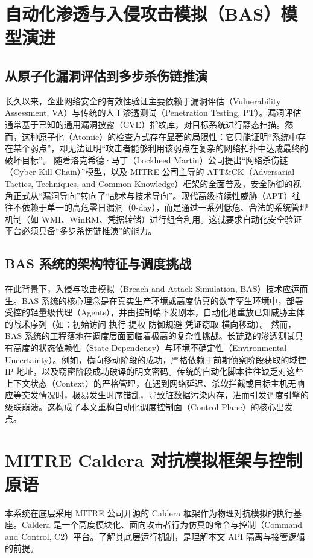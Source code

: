 \documentclass[twoside,openright]{xduugthesis}
\begin{document}
\section{自动化渗透与入侵攻击模拟（BAS）模型演进}

\subsection{从原子化漏洞评估到多步杀伤链推演}

长久以来，企业网络安全的有效性验证主要依赖于漏洞评估（Vulnerability Assessment, VA）与传统的人工渗透测试（Penetration Testing, PT）。漏洞评估通常基于已知的通用漏洞披露（CVE）指纹库，对目标系统进行静态扫描。然而，这种原子化（Atomic）的检查方式存在显著的局限性：它只能证明“系统中存在某个弱点”，却无法证明“攻击者能够利用该弱点在复杂的网络拓扑中达成最终的破坏目标”。
随着洛克希德·马丁（Lockheed Martin）公司提出“网络杀伤链（Cyber Kill Chain）”模型，以及 MITRE 公司主导的 ATT\&CK（Adversarial Tactics, Techniques, and Common Knowledge）框架的全面普及，安全防御的视角正式从“漏洞导向”转向了“战术与技术导向”\cite{strom2018mitre}。现代高级持续性威胁（APT）往往不依赖于单一的高危零日漏洞（0-day），而是通过一系列低危、合法的系统管理机制（如 WMI、WinRM、凭据转储）进行组合利用。这就要求自动化安全验证平台必须具备“多步杀伤链推演”的能力。

\subsection{ BAS 系统的架构特征与调度挑战}

在此背景下，入侵与攻击模拟（Breach and Attack Simulation, BAS）技术应运而生。BAS 系统的核心理念是在真实生产环境或高度仿真的数字孪生环境中，部署受控的轻量级代理（Agents），并由控制端下发剧本，自动化地重放已知威胁主体的战术序列（如：初始访问 \rightarrow 执行 \rightarrow 提权 \rightarrow 防御规避 \rightarrow 凭证窃取 \rightarrow 横向移动）\cite{alhaj2023cyber}。
然而，BAS 系统的工程落地在调度层面面临着极高的复杂性挑战。长链路的渗透测试具有高度的状态依赖性（State Dependency）与环境不确定性（Environmental Uncertainty）。例如，横向移动阶段的成功，严格依赖于前期侦察阶段获取的域控 IP 地址，以及窃密阶段成功破译的明文密码。传统的自动化脚本往往缺乏对这些上下文状态（Context）的严格管理，在遇到网络延迟、杀软拦截或目标主机无响应等突发情况时，极易发生时序错乱，导致脏数据污染内存，进而引发调度引擎的级联崩溃。这构成了本文重构自动化调度控制面（Control Plane）的核心出发点。

\section{MITRE Caldera 对抗模拟框架与控制原语}
本系统在底层采用 MITRE 公司开源的 Caldera 框架作为物理对抗模拟的执行基座。Caldera 是一个高度模块化、面向攻击者行为仿真的命令与控制（Command and Control, C2）平台\cite{mitre2024caldera}。了解其底层运行机制，是理解本文 API 隔离与接管逻辑的前提。
\end{document}
